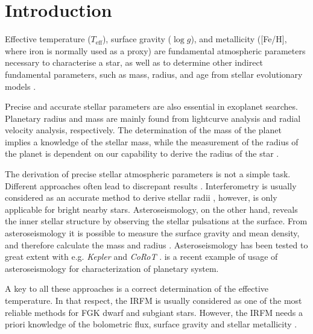 \documentclass{aa}
\begin{document}
\maketitle



\section{Introduction}
\label{sec:introduction}

Effective temperature ($T_\mathrm{eff}$), surface gravity ($\log g$),
and metallicity ([Fe/H], where iron is normally used as a proxy)
are fundamental atmospheric parameters necessary to characterise a
star, as well as to determine other indirect fundamental parameters,
such as mass, radius, and age from stellar evolutionary models
\citep[see e.g.][]{Girardi2000,Dotter2008,Baraffe2015}.

Precise and accurate stellar parameters are also essential in
exoplanet searches. Planetary radius and mass are mainly found from
lightcurve analysis and radial velocity analysis, respectively. The
determination of the mass of the planet implies a knowledge of the
stellar mass, while the measurement of the radius of the planet
is dependent on our capability to derive the radius of the star
\citep{Ammler2009,Torres2008,Torres2012}.

The derivation of precise stellar atmospheric parameters is not a simple
task. Different approaches often lead to discrepant results \citep[see
e.g.][]{Santos13}. Interferometry is usually considered as an accurate
method to derive stellar radii \citep[e.g.][]{Boyajian2012}, however,
is only applicable for bright nearby stars. Asteroseismology, on the
other hand, reveals the inner stellar structure by observing the stellar
pulsations at the surface. From asteroseismology it is possible to
measure the surface gravity and mean density, and therefore calculate
the mass and radius \citep[e.g.][]{Kjeldsen1995}. Asteroseismology has
been tested to great extent with e.g. \emph{Kepler} and \emph{CoRoT}
\citep{Michel2008,Huber2011,Huber2012}. \cite{Campante2015} is a recent
example of usage of asteroseismology for characterization of planetary
system.

A key to all these approaches is a correct determination of the
effective temperature. In that respect, the IRFM is usually
considered as one of the most reliable methods for FGK dwarf
and subgiant stars. However, the IRFM needs a priori knowledge
of the bolometric flux, surface gravity and stellar metallicity
\citep{Blackwell1977,Ramirez2005b,Casagrande2010}.
\end{document}
